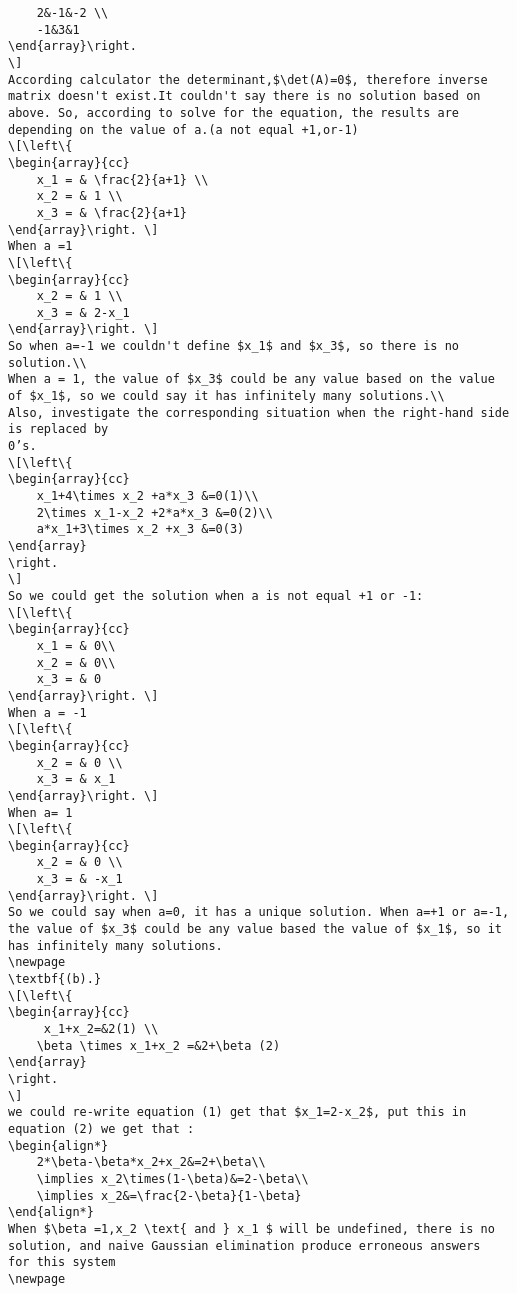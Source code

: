 \begin{verbatim}
    2&-1&-2 \\
    -1&3&1 
\end{array}\right.
\]
According calculator the determinant,$\det(A)=0$, therefore inverse matrix doesn't exist.It couldn't say there is no solution based on above. So, according to solve for the equation, the results are depending on the value of a.(a not equal +1,or-1)
\[\left\{
\begin{array}{cc}
    x_1 = & \frac{2}{a+1} \\
    x_2 = & 1 \\
    x_3 = & \frac{2}{a+1}
\end{array}\right. \]
When a =1 
\[\left\{
\begin{array}{cc}
    x_2 = & 1 \\
    x_3 = & 2-x_1
\end{array}\right. \]
So when a=-1 we couldn't define $x_1$ and $x_3$, so there is no solution.\\
When a = 1, the value of $x_3$ could be any value based on the value of $x_1$, so we could say it has infinitely many solutions.\\
Also, investigate the corresponding situation when the right-hand side is replaced by
0’s.
\[\left\{
\begin{array}{cc}
    x_1+4\times x_2 +a*x_3 &=0(1)\\
    2\times x_1-x_2 +2*a*x_3 &=0(2)\\
    a*x_1+3\times x_2 +x_3 &=0(3)
\end{array}
\right.
\]
So we could get the solution when a is not equal +1 or -1:
\[\left\{
\begin{array}{cc}
    x_1 = & 0\\
    x_2 = & 0\\
    x_3 = & 0
\end{array}\right. \]
When a = -1
\[\left\{
\begin{array}{cc}
    x_2 = & 0 \\
    x_3 = & x_1
\end{array}\right. \]
When a= 1
\[\left\{
\begin{array}{cc}
    x_2 = & 0 \\
    x_3 = & -x_1
\end{array}\right. \]
So we could say when a=0, it has a unique solution. When a=+1 or a=-1, the value of $x_3$ could be any value based the value of $x_1$, so it has infinitely many solutions.
\newpage
\textbf{(b).}
\[\left\{
\begin{array}{cc}
     x_1+x_2=&2(1) \\
    \beta \times x_1+x_2 =&2+\beta (2)
\end{array}
\right.
\]
we could re-write equation (1) get that $x_1=2-x_2$, put this in equation (2) we get that :
\begin{align*}
    2*\beta-\beta*x_2+x_2&=2+\beta\\
    \implies x_2\times(1-\beta)&=2-\beta\\
    \implies x_2&=\frac{2-\beta}{1-\beta}
\end{align*}
When $\beta =1,x_2 \text{ and } x_1 $ will be undefined, there is no solution, and naive Gaussian elimination produce erroneous answers
for this system
\newpage

\end{verbatim}

